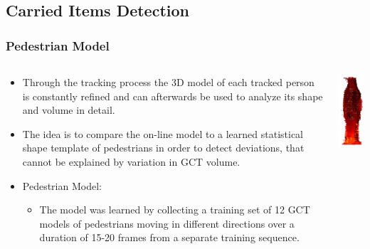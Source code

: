 \documentclass{beamer}
\begin{document}
\subsection{Carried Items Detection}
\begin{frame}
\frametitle{Pedestrian Model} 
\begin{columns}[T]
    \begin{column}{.7\textwidth}
     \begin{itemize}
	  \item Through the tracking process the 3D model of each tracked person is constantly refined and can afterwards be used to analyze its shape and volume in detail.
	  \item The idea is to compare the on-line model to a learned statistical shape template of pedestrians in order to detect deviations, that cannot be explained by variation in GCT volume.
	  \item Pedestrian Model:
	  \begin{itemize}
	  	\item The model was learned by collecting a training set of 12 GCT models of pedestrians moving in different directions over a duration of 15-20 frames from a separate training sequence.
	  \end{itemize}
\end{itemize}
    \end{column}
    \begin{column}{.3\textwidth}
    	\includegraphics[width=2.5cm]{pedestian_model.jpg}
    \end{column}
\end{columns}
\end{frame}
\end{document}
